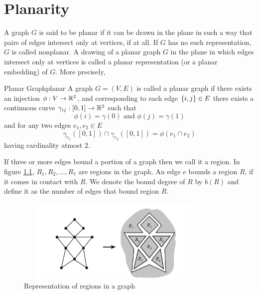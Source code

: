 \documentclass[../basic_graph_theory.tex]{subfiles}
\begin{document}
\chapter{Planarity}
\setcounter{chapter}{6} %
\setcounter{section}{0}
\setcounter{equation}{0}
\setcounter{figure}{0}

A graph $G$ is said to be planar if it can be drawn in the plane in such a way that pairs of edges intersect only at vertices, if at all. If $G$ has no such representation, $G$ is called nonplanar. A drawing of a planar graph $G$ in the plane in which edges intersect only at vertices is called a planar representation (or a planar embedding) of $G$. More precisely,

\begin{Def}{Planar Graph}{planar}
    A graph $G=(V,E)$ is called a planar graph if there exists an injection $\phi: V \to \mathbb{R}^{2}$, and corresponding to each edge \(\qty{i,j} \in E\) there exists a continuous curve $\gamma_{ij} : [0, 1] \to \mathbb{R}^2$ such that
    \[\phi(i) = \gamma(0) \text{ and } \phi(j) = \gamma(1)\]
    and for any two edges \(e_1, e_2 \in E\)
    \[\gamma_{e_1}([0,1]) \cap \gamma_{e_2}([0,1]) = \phi(e_1 \cap e_2)\]
    having cardinality atmost 2.
\end{Def}

If three or more edges bound a portion of a graph then we call it a region. In figure \ref{ref:regions}, $R_1, R_2, \dots, R_7$ are regions in the graph. An edge $e$ bounds a region $R$, if it comes in contact with $R$. We denote the bound degree of $R$ by $b(R)$ and define it as the number of edges that bound region $R$.

\begin{figure}[hbt!]
    \centering
    \includegraphics[height=4cm,width=9.5cm]{images/region.png}
    \caption{Representation of regions in a graph}
    \label{ref:regions}
\end{figure}
\end{document}
